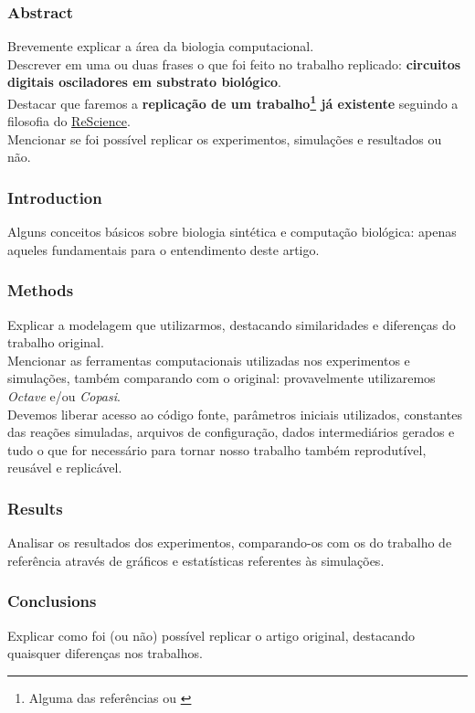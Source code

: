 
\subsubsection{Abstract}

Brevemente explicar a área da biologia computacional.\\
Descrever em uma ou duas frases o que foi feito no trabalho replicado: \textbf{circuitos digitais osciladores em substrato biológico}.\\
Destacar que faremos a \textbf{replicação de um trabalho\footnote{Alguma das referências \cite{oscillator} ou \cite{clock}} já existente} seguindo a filosofia do \href{http://rescience.github.io/}{ReScience}.\\
Mencionar se foi possível replicar os experimentos, simulações e resultados ou não.\\


\subsubsection{Introduction}

Alguns conceitos básicos sobre biologia sintética e computação biológica:
apenas aqueles fundamentais para o entendimento deste artigo.\\


\subsubsection{Methods}

Explicar a modelagem que utilizarmos, destacando similaridades e diferenças do trabalho original.\\
Mencionar as ferramentas computacionais utilizadas nos experimentos e simulações, também comparando com o original:
provavelmente utilizaremos \textit{Octave} e/ou \textit{Copasi}.\\
Devemos liberar acesso ao código fonte, parâmetros iniciais utilizados, constantes das reações simuladas, arquivos de configuração, dados intermediários gerados e tudo o que for necessário para tornar nosso trabalho também reprodutível, reusável e replicável.\\


\subsubsection{Results}

Analisar os resultados dos experimentos, comparando-os com os do trabalho de referência através de gráficos e estatísticas referentes às simulações.\\


\subsubsection{Conclusions}

Explicar como foi (ou não) possível replicar o artigo original, destacando quaisquer diferenças nos trabalhos.\\
